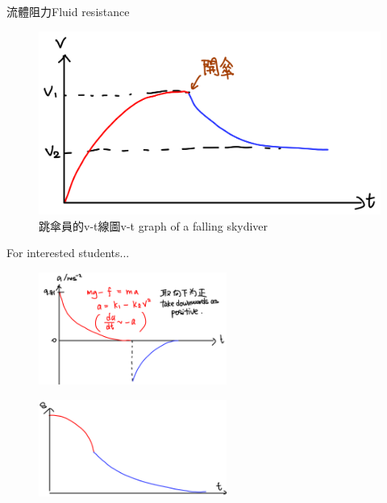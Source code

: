 \documentclass[beamer=true]{standalone}
\begin{document}
\begin{frame}{流體阻力Fluid resistance}
    \begin{figure}[h!]
        \centering
        \includegraphics[width=.8\textwidth]{assets/7930445f.png}
        \caption{跳傘員的v-t線圖v-t graph of a falling skydiver}
    \end{figure}
\end{frame}
\begin{frame}{For interested students...}
    \begin{figure}[h!]
        \centering
        \includegraphics[width=0.55\textwidth]{assets/eda84940.png}
    \end{figure}
    \begin{figure}[h!]
        \centering
        \includegraphics[width=0.55\textwidth]{assets/6689e5f4.png}
    \end{figure}
\end{frame}
\end{document}
